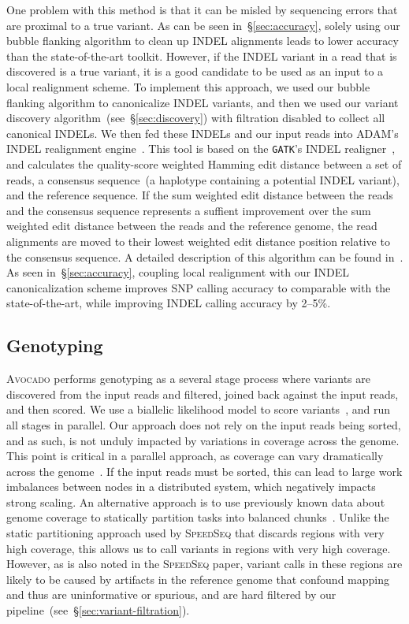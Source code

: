\documentclass{bioinfo}
\begin{document}
\begin{methods}
One problem with this method is that it can be misled by sequencing errors
that are proximal to a true variant. As can be seen in~\S\ref{sec:accuracy},
solely using our bubble flanking algorithm to clean up INDEL alignments leads
to lower accuracy than the state-of-the-art toolkit. However, if the INDEL
variant in a read that is discovered is a true variant, it is a good candidate
to be used as an input to a local realignment scheme.  To implement this
approach, we used our bubble flanking algorithm to canonicalize INDEL variants,
and then we used our variant discovery algorithm~(see~\S\ref{sec:discovery})
with filtration disabled to collect all canonical INDELs. We then fed these
INDELs and our input reads into \textsc{ADAM}'s INDEL realignment
engine~\citep{massie13, nothaft15}. This tool is based on the \texttt{GATK}'s
INDEL realigner~\citep{depristo11}, and calculates the quality-score
weighted Hamming edit distance between a set of reads, a consensus sequence~(a
haplotype containing a potential INDEL variant), and the reference sequence. If
the sum weighted edit distance between the reads and the consensus sequence
represents a suffient improvement over the sum weighted edit distance between
the reads and the reference genome, the read alignments are moved to their
lowest weighted edit distance position relative to the consensus sequence.
A detailed description of this algorithm can be found in~\citet{nothaft15avocado}.
As seen in~\S\ref{sec:accuracy}, coupling local realignment with our INDEL
canonicalization scheme improves SNP calling accuracy to comparable with the
state-of-the-art, while improving INDEL calling accuracy by 2--5\%.

\subsection{Genotyping}
\label{sec:genotyping}

\textsc{Avocado} performs genotyping as a several stage process where variants
are discovered from the input reads and filtered, joined back against the input
reads, and then scored. We use a biallelic likelihood model to score
variants~\citep{li11}, and run all stages in parallel. Our approach does not
rely on the input reads being sorted, and as such, is not unduly impacted by
variations in coverage across the genome. This point is critical in a parallel
approach, as coverage can vary dramatically across the genome~\citep{pinard06}.
If the input reads must be sorted, this can lead to large work imbalances
between nodes in a distributed system, which negatively impacts strong scaling.
An alternative approach is to use previously known data about genome coverage
to statically partition tasks into balanced chunks~\cite{chiang15}. Unlike the
static partitioning approach used by \textsc{SpeedSeq} that discards regions with
very high coverage, this allows us to call variants in regions with very high
coverage. However, as is also noted in the \textsc{SpeedSeq} paper, variant calls
in these regions are likely to be caused by artifacts in the reference genome that
confound mapping and thus are uninformative or spurious, and are hard filtered by
our pipeline~(see~\S\ref{sec:variant-filtration}).


\end{methods}
\end{document}
